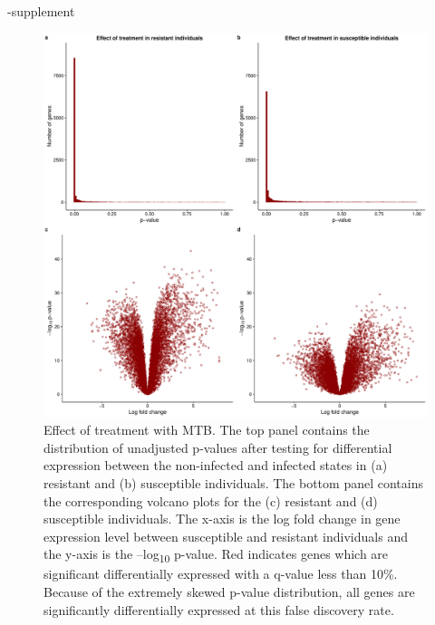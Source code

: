 \documentclass[fleqn,10pt]{wlscirep}
\begin{document}
\begin{filecontents}{\jobname-supplement}
\begin{figure}[ht]
\centering
\includegraphics[width=\linewidth]{../figure/limma-supp.pdf}
\caption{
Effect of treatment with MTB. The top panel contains the distribution
of unadjusted p-values after testing for differential expression
between the non-infected and infected states in (a) resistant and (b)
susceptible individuals. The bottom panel contains the corresponding
volcano plots for the (c) resistant and (d) susceptible individuals.
The x-axis is the log fold change in gene expression level between
susceptible and resistant individuals and the y-axis is the
–log\textsubscript{10} p-value. Red indicates genes which are
significant differentially expressed with a q-value less than 10\%.
Because of the extremely skewed p-value distribution, all genes are
significantly differentially expressed at this false discovery rate.
}
\label{fig:limma-supp}
\end{figure}


\end{filecontents}
\end{document}
